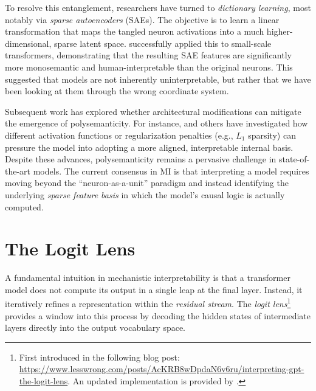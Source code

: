 To resolve this entanglement, researchers have turned to \emph{dictionary learning}, most notably via \emph{sparse autoencoders} (SAEs). The objective is to learn a linear transformation that maps the tangled neuron activations into a much higher-dimensional, sparse latent space. \citet{bricken2023monosemanticity} successfully applied this to small-scale transformers, demonstrating that the resulting SAE features are significantly more monosemantic and human-interpretable than the original neurons. This suggested that models are not inherently uninterpretable, but rather that we have been looking at them through the wrong coordinate system.

Subsequent work has explored whether architectural modifications can mitigate the emergence of polysemanticity. For instance, \citet{liu2023seeing} and others have investigated how different activation functions or regularization penalties (e.g., $L_1$ sparsity) can pressure the model into adopting a more aligned, interpretable internal basis. Despite these advances, polysemanticity remains a pervasive challenge in state-of-the-art models. The current consensus in MI is that interpreting a model requires moving beyond the ``neuron-as-a-unit'' paradigm and instead identifying the underlying \emph{sparse feature basis} in which the model's causal logic is actually computed.




\section{The Logit Lens}

A fundamental intuition in mechanistic interpretability is that a transformer model does not compute its output in a single leap at the final layer. Instead, it iteratively refines a representation within the \emph{residual stream}. The \textit{logit lens}\footnote{First introduced in the following blog post: \url{https://www.lesswrong.com/posts/AcKRB8wDpdaN6v6ru/interpreting-gpt-the-logit-lens}. An updated implementation is provided by \citep{wang2025logitlens4llmsextendinglogitlens}.} provides a window into this process by decoding the hidden states of intermediate layers directly into the output vocabulary space.

